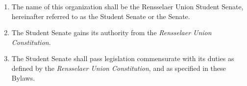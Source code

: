 \begin{enumerate}
    \item The name of this organization shall be the Rensselaer Union Student Senate, hereinafter referred to as the Student Senate or the
    Senate.
    \item The Student Senate gains its authority from the \textit{Rensselaer Union Constitution}.
    \item The Student Senate shall pass legislation commensurate with its duties as defined by the \textit{Rensselaer Union Constitution}, and as
    specified in these Bylaws.
\end{enumerate}

